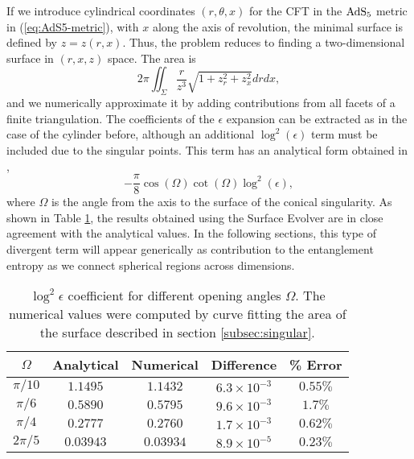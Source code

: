 \documentclass[11 pt]{article}
\begin{document}
If we introduce cylindrical coordinates $(r,\theta,x)$ for the CFT in the $\rm AdS_5$ metric in (\ref{eq:AdS5-metric}), with $x$ along the axis of revolution, the minimal surface is defined by $z=z(r,x)$. Thus, the problem reduces to finding a two-dimensional surface in $(r,x,z)$ space. The area is
$$2\pi \iint_\Sigma\frac{r}{z^3}\sqrt{1+z_r^2+z_x^2}drdx,$$
and we numerically approximate it by adding contributions from all facets of a finite triangulation. The coefficients of the $\epsilon$ expansion can be extracted as in the case of the cylinder before, although an additional $\log^2(\epsilon)$ term must be included due to the singular points. This term has an analytical form obtained in \cite{Myers2012},
\begin{equation}
    -\frac{\pi}{8}\cos(\Omega)\cot(\Omega)\log^2(\epsilon),
    \label{corner_log2}
\end{equation}
where $\Omega$ is the angle from the axis to the surface of the conical singularity. As shown in Table \ref{tab:corner_log2}, the results obtained using the Surface Evolver are in close agreement with the analytical values. In the following sections, this type of divergent term will appear generically as contribution to the entanglement entropy as we connect spherical regions across dimensions.

%
\begin{table}[h!]
\begin{center}
\begin{tabular}{ |c||c|c|c|c|  }
 \hline
 $\Omega$ & Analytical & Numerical & Difference & \% Error\\
 \hline
 $\pi/10$ & $1.1495$ & $1.1432$ & $6.3\times 10^{-3}$ & $0.55 \%$\\
 $\pi/6$ & $0.5890$ & $0.5795$ & $9.6\times 10^{-3}$ & $1.7 \%$\\
 $\pi/4$ & $0.2777$ & $0.2760$ & $1.7\times 10^{-3}$ & $0.62 \%$\\
 $2\pi/5$ & $0.03943$ & $0.03934$ & $8.9\times 10^{-5}$ & $0.23 \%$\\
 \hline
\end{tabular}
\end{center}
\caption{$\log^2\epsilon$ coefficient for different opening angles $\Omega$. The numerical values were computed by curve fitting the area of the surface described in section \ref{subsec:singular}.}
\label{tab:corner_log2}
\end{table}

\end{document}

